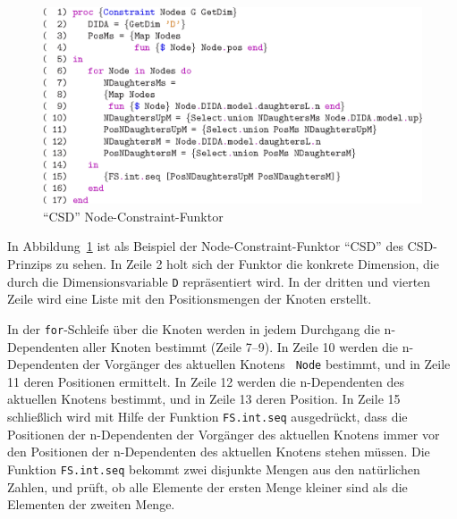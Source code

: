 \begin{figure}
\begin{center}
\includegraphics[scale=1.0]{eps/csdconstraint_n}
\end{center}
\caption{``CSD'' Node-Constraint-Funktor}
\label{CSDFunctor}
\end{figure}

In Abbildung~\ref{CSDFunctor} ist als Beispiel der
Node-Constraint-Funktor ``CSD'' des CSD-Prinzips zu sehen. In Zeile 2
holt sich der Funktor die konkrete Dimension, die durch die
Dimensionsvariable {\tt D} repr\"asentiert wird. In der dritten und
vierten Zeile wird eine Liste mit den Positionsmengen der Knoten
erstellt.

In der {\tt for}-Schleife \"uber die Knoten werden in jedem Durchgang
die n-Dependenten aller Knoten bestimmt (Zeile 7--9). In Zeile 10
werden die n-Dependenten der Vorg\"anger des aktuellen Knotens {\tt
Node} bestimmt, und in Zeile 11 deren Positionen ermittelt.  In Zeile
12 werden die n-Dependenten des aktuellen Knotens bestimmt, und in
Zeile 13 deren Position. In Zeile 15 schlie{\ss}lich wird mit Hilfe
der Funktion {\tt FS.int.seq} ausgedr\"uckt, dass die Positionen der
n-Dependenten der Vorg\"anger des aktuellen Knotens immer vor den
Positionen der n-Dependenten des aktuellen Knotens stehen m\"ussen.
Die Funktion {\tt FS.int.seq} bekommt zwei disjunkte Mengen aus den
nat\"urlichen Zahlen, und pr\"uft, ob alle Elemente der ersten Menge
kleiner sind als die Elementen der zweiten Menge.

